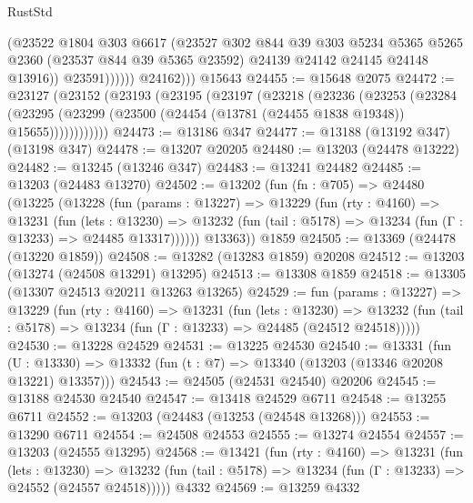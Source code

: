 \begin{lexlean}{RustStd}
\begin{coremodule}
                      (@23522
                        @1804
                        @303
                        @6617
                        (@23527
                          @302
                          @844
                          @39
                          @303
                          @5234
                          @5365
                          @5265
                          @2360
                          (@23537 @844 @39 @5365 @23592)
                          @24139
                          @24142
                          @24145
                          @24148
                          @13916))
                      @23591))))))
          @24162)))
    @15643
@24455 := @15648 @2075
@24472 := @23127
    (@23152
      (@23193
        (@23195
          (@23197
            (@23218
              (@23236
                (@23253
                  (@23284
                    (@23295
                      (@23299 (@23500 (@24454 (@13781 (@24455 @1838 @19348)) @15655))))))))))))
@24473 := @13186 @347
@24477 := @13188 (@13192 @347) (@13198 @347)
@24478 := @13207 @20205
@24480 := @13203 (@24478 @13222)
@24482 := @13245 (@13246 @347)
@24483 := @13241 @24482
@24485 := @13203 (@24483 @13270)
@24502 := @13202
    (fun (fn : @705) =>
    @24480
      (@13225
        (@13228
          (fun (params : @13227) =>
          @13229
            (fun (rty : @4160) =>
            @13231
              (fun (lets : @13230) =>
              @13232 (fun (tail : @5178) => @13234 (fun (Γ : @13233) => @24485 @13317))))))
        @13363))
    @1859
@24505 := @13369 (@24478 (@13220 @1859))
@24508 := @13282 (@13283 @1859) @20208
@24512 := @13203 (@13274 (@24508 @13291) @13295)
@24513 := @13308 @1859
@24518 := @13305 (@13307 @24513 @20211 @13263 @13265)
@24529 := fun (params : @13227) =>
  @13229
    (fun (rty : @4160) =>
    @13231
      (fun (lets : @13230) =>
      @13232 (fun (tail : @5178) => @13234 (fun (Γ : @13233) => @24485 (@24512 @24518)))))
@24530 := @13228 @24529
@24531 := @13225 @24530
@24540 := @13331
    (fun (U : @13330) => @13332 (fun (t : @7) => @13340 (@13203 (@13346 @20208 @13221) @13357)))
@24543 := @24505 (@24531 @24540) @20206
@24545 := @13188 @24530 @24540
@24547 := @13418 @24529 @6711
@24548 := @13255 @6711
@24552 := @13203 (@24483 (@13253 (@24548 @13268)))
@24553 := @13290 @6711
@24554 := @24508 @24553
@24555 := @13274 @24554
@24557 := @13203 (@24555 @13295)
@24568 := @13421
    (fun (rty : @4160) =>
    @13231
      (fun (lets : @13230) =>
      @13232 (fun (tail : @5178) => @13234 (fun (Γ : @13233) => @24552 (@24557 @24518)))))
    @4332
@24569 := @13259 @4332

\end{coremodule}
\end{lexlean}
